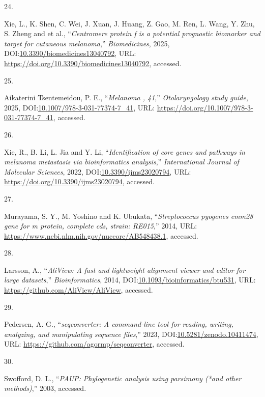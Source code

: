 \documentclass[
]{article}
\newlength{\cslhangindent}
\newlength{\csllabelwidth}
\newenvironment{CSLReferences}[2] %
 {\begin{list}{}{%
  \setlength{\itemindent}{0pt}
  \setlength{\leftmargin}{0pt}
  \setlength{\parsep}{0pt}
  \ifodd #1
   \setlength{\leftmargin}{\cslhangindent}
   \setlength{\itemindent}{-1\cslhangindent}
  \fi
  \setlength{\itemsep}{#2\baselineskip}}}
 {\end{list}}
\newcommand{\CSLLeftMargin}[1]{\parbox[t]{\csllabelwidth}{\strut#1\strut}}
\newcommand{\CSLRightInline}[1]{\parbox[t]{\linewidth - \csllabelwidth}{\strut#1\strut}}
\begin{document}
\begin{CSLReferences}{0}{1}
\CSLLeftMargin{24. }%
\CSLRightInline{Xie, L., K. Shen, C. Wei, J. Xuan, J. Huang, Z. Gao, M.
Ren, L. Wang, Y. Zhu, S. Zheng and et al., {``\emph{Centromere protein f
is a potential prognostic biomarker and target for cutaneous
melanoma},''} \emph{Biomedicines}, 2025,
DOI:\href{https://doi.org/10.3390/biomedicines13040792}{10.3390/biomedicines13040792},
URL: \url{https://doi.org/10.3390/biomedicines13040792}, accessed.}

\CSLLeftMargin{25. }%
\CSLRightInline{Aikaterini Tsentemeidou, P. E., {``\emph{Melanoma ,
41},''} \emph{Otolaryngology study guide}, 2025,
DOI:\href{https://doi.org/10.1007/978-3-031-77374-7_41}{10.1007/978-3-031-77374-7\_41},
URL: \url{https://doi.org/10.1007/978-3-031-77374-7_41}, accessed.}

\CSLLeftMargin{26. }%
\CSLRightInline{Xie, R., B. Li, L. Jia and Y. Li,
{``\emph{Identification of core genes and pathways in melanoma
metastasis via bioinformatics analysis},''} \emph{International Journal
of Molecular Sciences}, 2022,
DOI:\href{https://doi.org/10.3390/ijms23020794}{10.3390/ijms23020794},
URL: \url{https://doi.org/10.3390/ijms23020794}, accessed.}

\CSLLeftMargin{27. }%
\CSLRightInline{Murayama, S. Y., M. Yoshino and K. Ubukata,
{``\emph{Streptococcus pyogenes emm28 gene for m protein, complete cds,
strain: RE015},''} 2014, URL:
\url{https://www.ncbi.nlm.nih.gov/nuccore/AB548438.1}, accessed.}

\CSLLeftMargin{28. }%
\CSLRightInline{Larsson, A., {``\emph{{AliView}: A fast and lightweight
alignment viewer and editor for large datasets},''}
\emph{Bioinformatics}, 2014,
DOI:\href{https://doi.org/10.1093/bioinformatics/btu531}{10.1093/bioinformatics/btu531},
URL: \url{https://github.com/AliView/AliView}, accessed.}

\CSLLeftMargin{29. }%
\CSLRightInline{Pedersen, A. G., {``\emph{{seqconverter}: A command-line
tool for reading, writing, analyzing, and manipulating sequence
files},''} 2023,
DOI:\href{https://doi.org/10.5281/zenodo.10411474}{10.5281/zenodo.10411474},
URL: \url{https://github.com/agormp/seqconverter}, accessed.}

\CSLLeftMargin{30. }%
\CSLRightInline{Swofford, D. L., {``\emph{{PAUP\*}: Phylogenetic
analysis using parsimony (*and other methods)},''} 2003, accessed.}


\end{CSLReferences}
\end{document}
